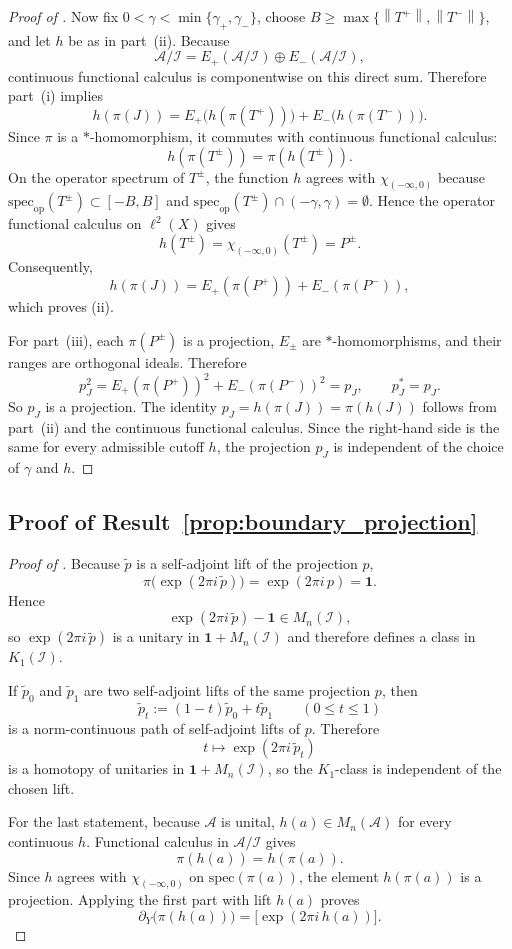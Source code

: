 \documentclass[11pt]{article}
\numberwithin{equation}{section}
\theoremstyle{definition}
\theoremstyle{remark}
\newcommand{\Id}{\mathbf{1}}
\newcommand{\spec}{\mathrm{spec}}
\newcommand{\opnorm}[1]{\left\lVert#1\right\rVert}
\begin{document}
\begin{proof}[Proof of ]
Now fix $0<\gamma<\min\{\gamma_+,\gamma_-\}$, choose
$B\ge\max\{\opnorm{T^+},\opnorm{T^-}\}$, and let $h$ be as in part~(ii).
Because
\[
\mathcal A/\mathcal I
=
E_+(\mathcal A/\mathcal I)\oplus E_-(\mathcal A/\mathcal I),
\]
continuous functional calculus is componentwise on this direct sum. Therefore part~(i) implies
\[
h(\pi(J))
=
E_+\!\bigl(h(\pi(T^+))\bigr)
+
E_-\!\bigl(h(\pi(T^-))\bigr).
\]
Since $\pi$ is a $*$-homomorphism, it commutes with continuous functional calculus:
\[
h(\pi(T^\pm))=\pi(h(T^\pm)).
\]
On the operator spectrum of $T^\pm$, the function $h$ agrees with $\chi_{(-\infty,0)}$ because
$\spec_{\mathrm{op}}(T^\pm)\subset[-B,B]$ and
$\spec_{\mathrm{op}}(T^\pm)\cap(-\gamma,\gamma)=\emptyset$. Hence the operator functional
calculus on $\ell^2(X)$ gives
\[
h(T^\pm)=\chi_{(-\infty,0)}(T^\pm)=P^\pm.
\]
Consequently,
\[
h(\pi(J))
=
E_+(\pi(P^+))+E_-(\pi(P^-)),
\]
which proves (ii).

For part~(iii), each $\pi(P^\pm)$ is a projection, $E_\pm$ are $*$-homomorphisms, and their
ranges are orthogonal ideals. Therefore
\[
p_J^2
=
E_+(\pi(P^+))^2+E_-(\pi(P^-))^2
=
p_J,
\qquad
p_J^*=p_J.
\]
So $p_J$ is a projection. The identity $p_J=h(\pi(J))=\pi(h(J))$ follows from part~(ii) and the
continuous functional calculus. Since the right-hand side is the same for every admissible cutoff
$h$, the projection $p_J$ is independent of the choice of $\gamma$ and $h$.
\end{proof}

\subsection{Proof of Result~\ref{prop:boundary_projection}}\label{app:proof:prop:boundary_projection}
\begin{proof}[Proof of ]
Because $\widetilde p$ is a self-adjoint lift of the projection $p$,
\[
\pi\!\bigl(\exp(2\pi i\,\widetilde p)\bigr)=\exp(2\pi i\,p)=\Id.
\]
Hence
\[
\exp(2\pi i\,\widetilde p)-\Id \in M_n(\mathcal I),
\]
so $\exp(2\pi i\,\widetilde p)$ is a unitary in $\Id+M_n(\mathcal I)$ and therefore defines a class
in $K_1(\mathcal I)$.

If $\widetilde p_0$ and $\widetilde p_1$ are two self-adjoint lifts of the same projection $p$, then
\[
\widetilde p_t:=(1-t)\widetilde p_0+t\widetilde p_1
\qquad (0\le t\le 1)
\]
is a norm-continuous path of self-adjoint lifts of $p$. Therefore
\[
t\longmapsto \exp(2\pi i\,\widetilde p_t)
\]
is a homotopy of unitaries in $\Id+M_n(\mathcal I)$, so the $K_1$-class is independent of the
chosen lift.

For the last statement, because $\mathcal A$ is unital, $h(a)\in M_n(\mathcal A)$ for every
continuous $h$. Functional calculus in $\mathcal A/\mathcal I$ gives
\[
\pi(h(a))=h(\pi(a)).
\]
Since $h$ agrees with $\chi_{(-\infty,0)}$ on $\spec(\pi(a))$, the element $h(\pi(a))$ is a
projection. Applying the first part with lift $h(a)$ proves
\[
\partial_Y\!\bigl(\pi(h(a))\bigr)
=
\bigl[\exp(2\pi i\,h(a))\bigr].
\]
\end{proof}
\end{document}
